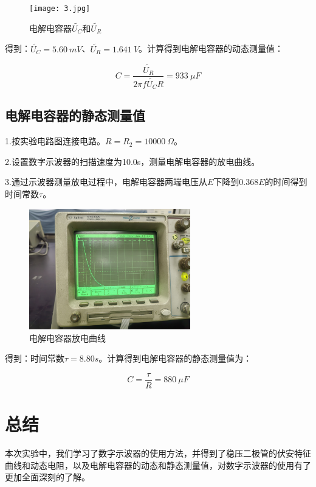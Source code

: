 \documentclass{article}
\begin{document}
\begin{figure}[!ht]
    \centering
    \texttt{[image: 3.jpg]}
    \caption{电解电容器$\widetilde{U_C}$和$\widetilde{U_R}$}
\end{figure}

得到：$\widetilde{U_C}=5.60\ mV$、$\widetilde{U_R}=1.641\ V$。计算得到电解电容器的动态测量值：

$$
C=\frac{\widetilde{U_R}}{2\pi f\widetilde{U_C}R}=933\ \mu F
$$

\subsection{电解电容器的静态测量值}
1.按实验电路图连接电路。$R=R_2=10000\ \Omega$。

2.设置数字示波器的扫描速度为10.0s，测量电解电容器的放电曲线。

3.通过示波器测量放电过程中，电解电容器两端电压从$E$下降到$0.368E$的时间得到时间常数$\tau$。

\begin{figure}[!ht]
    \centering
    \includegraphics[width=7cm]{4.jpg}
    \caption{电解电容器放电曲线}
\end{figure}

得到：时间常数$\tau=8.80s$。计算得到电解电容器的静态测量值为：

$$
C=\frac{\tau}{R}=880\ \mu F
$$

\section{总结}
本次实验中，我们学习了数字示波器的使用方法，并得到了稳压二极管的伏安特征曲线和动态电阻，以及电解电容器的动态和静态测量值，对数字示波器的使用有了更加全面深刻的了解。
\end{document}
